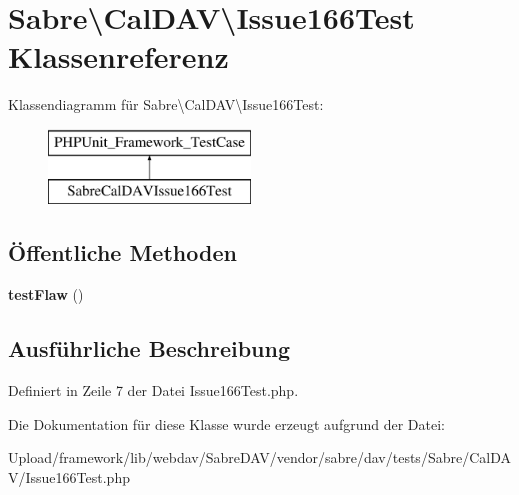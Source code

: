 \hypertarget{class_sabre_1_1_cal_d_a_v_1_1_issue166_test}{}\section{Sabre\textbackslash{}Cal\+D\+AV\textbackslash{}Issue166\+Test Klassenreferenz}
\label{class_sabre_1_1_cal_d_a_v_1_1_issue166_test}
Klassendiagramm für Sabre\textbackslash{}Cal\+D\+AV\textbackslash{}Issue166\+Test\+:\begin{figure}[H]
\begin{center}
\leavevmode
\includegraphics[height=2.000000cm]{class_sabre_1_1_cal_d_a_v_1_1_issue166_test}
\end{center}
\end{figure}
\subsection*{Öffentliche Methoden}
\begin{DoxyCompactItemize}
\item 
\mbox{\label{class_sabre_1_1_cal_d_a_v_1_1_issue166_test_ad0960270b7a5f9b241d5b8934eed169b}} 
{\bfseries test\+Flaw} ()
\end{DoxyCompactItemize}


\subsection{Ausführliche Beschreibung}


Definiert in Zeile 7 der Datei Issue166\+Test.\+php.



Die Dokumentation für diese Klasse wurde erzeugt aufgrund der Datei\+:\begin{DoxyCompactItemize}
\item 
Upload/framework/lib/webdav/\+Sabre\+D\+A\+V/vendor/sabre/dav/tests/\+Sabre/\+Cal\+D\+A\+V/Issue166\+Test.\+php\end{DoxyCompactItemize}
